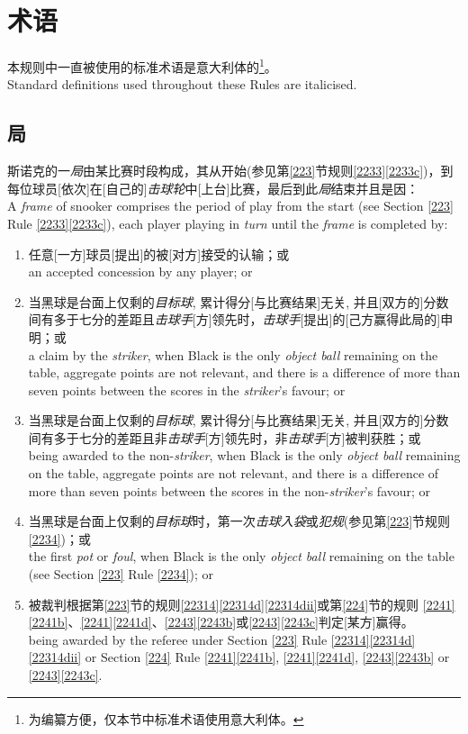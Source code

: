 \section{术语}\label{222}

\noindent 本规则中一直被使用的标准术语是意大利体的\footnote{为编纂方便，仅本节中标准术语使用意大利体。}。\\
Standard definitions used throughout these Rules are italicised.

\subsection{局}\label{2221}

\noindent 斯诺克的一\emph{局}由某比赛时段构成，其从开始(参见第\ref{223}节规则\ref{2233}\ref{2233c})，到每位球员[依次]在[自己的]\emph{击球轮}中[上台]比赛，最后到此\emph{局}结束并且是因：\\
A \emph{frame} of snooker comprises the period of play from the start (see Section \ref{223} Rule \ref{2233}\ref{2233c}), each player playing in \emph{turn} until the \emph{frame} is completed by:
\begin{enumerate}[label=(\alph*)]
    \item 任意[一方]球员[提出]的被[对方]接受的认输；或\\
    an accepted concession by any player; or
    \item 当黑球是台面上仅剩的\emph{目标球}, 累计得分[与比赛结果]无关, 并且[双方的]分数间有多于七分的差距且\emph{击球手}[方]领先时，\emph{击球手}[提出]的[己方赢得此局的]申明；或\\
    a claim by the \emph{striker}, when Black is the only \emph{object ball} remaining on the table, aggregate points are not relevant, and there is a difference of more than seven points between the scores in the \emph{striker}'s favour; or
    \item 当黑球是台面上仅剩的\emph{目标球}, 累计得分[与比赛结果]无关, 并且[双方的]分数间有多于七分的差距且非\emph{击球手}[方]领先时，非\emph{击球手}[方]被判获胜；或\\
    being awarded to the non-\emph{striker}, when Black is the only \emph{object ball} remaining on the table, aggregate points are not relevant, and there is a difference of more than seven points between the scores in the non-\emph{striker}'s favour; or
    \item 当黑球是台面上仅剩的\emph{目标球}时，第一次\emph{击球入袋}或\emph{犯规}(参见第\ref{223}节规则\ref{2234})；或\\
    the first \emph{pot} or \emph{foul}, when Black is the only \emph{object ball} remaining on the table (see Section \ref{223} Rule \ref{2234}); or
    \item 被裁判根据第\ref{223}节的规则\ref{22314}\ref{22314d}\ref{22314dii}或第\ref{224}节的规则 \ref{2241}\ref{2241b}、\ref{2241}\ref{2241d}、\ref{2243}\ref{2243b}或\ref{2243}\ref{2243c}判定[某方]赢得。\\
    being awarded by the referee under Section \ref{223} Rule \ref{22314}\ref{22314d} \ref{22314dii} or Section \ref{224} Rule \ref{2241}\ref{2241b}, \ref{2241}\ref{2241d}, \ref{2243}\ref{2243b} or \ref{2243}\ref{2243c}.
\end{enumerate}

